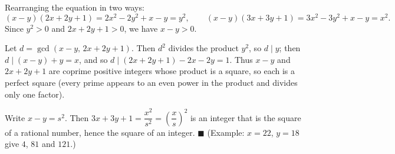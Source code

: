 Rearranging the equation in two ways:
\[(x-y)(2x+2y+1)=2x^2-2y^2+x-y=y^2,\qquad(x-y)(3x+3y+1)=3x^2-3y^2+x-y=x^2.\]
Since $y^2>0$ and $2x+2y+1>0$, we have $x-y>0$.

Let $d=\gcd(x-y,\,2x+2y+1)$. Then $d^2$ divides the product $y^2$, so $d\mid y$; then $d\mid(x-y)+y=x$, and so $d\mid(2x+2y+1)-2x-2y=1$. Thus $x-y$ and $2x+2y+1$ are coprime positive integers whose product is a square, so each is a perfect square (every prime appears to an even power in the product and divides only one factor).

Write $x-y=s^2$. Then $3x+3y+1=\dfrac{x^2}{s^2}=\left(\dfrac xs\right)^2$ is an integer that is the square of a rational number, hence the square of an integer. $\blacksquare$ (Example: $x=22$, $y=18$ give $4$, $81$ and $121$.)
